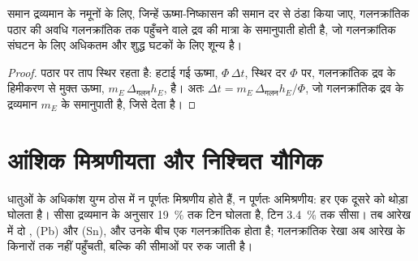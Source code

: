 \begin{proposition}[गलनक्रांतिक पठार की लंबाई]\label{prop:b2:solid-liquid-diagrams:plateau-length}
समान द्रव्यमान के नमूनों के लिए, जिन्हें ऊष्मा-निष्कासन की समान दर से ठंडा किया जाए,
गलनक्रांतिक पठार की अवधि गलनक्रांतिक तक पहुँचने वाले द्रव की मात्रा के
समानुपाती होती है, जो गलनक्रांतिक संघटन के लिए अधिकतम और शुद्ध घटकों के लिए
शून्य है।
\end{proposition}

\begin{proof}
पठार पर ताप स्थिर रहता है: हटाई गई ऊष्मा, $\Phi\,\Delta t$, स्थिर दर $\Phi$ पर,
गलनक्रांतिक द्रव के हिमीकरण से मुक्त ऊष्मा, $m_E\,\Delta_{\text{गलन}}h_E$, है। अतः $\Delta t = m_E\,\Delta_{\text{गलन}}h_E/
\Phi$, जो गलनक्रांतिक द्रव के द्रव्यमान $m_E$ के समानुपाती है, जिसे  देता है।
\end{proof}

\section{आंशिक मिश्रणीयता और निश्चित यौगिक}

धातुओं के अधिकांश युग्म ठोस में न पूर्णतः मिश्रणीय होते हैं, न पूर्णतः अमिश्रणीय:
हर एक दूसरे को थोड़ा घोलता है। सीसा द्रव्यमान के अनुसार 19~\% तक टिन घोलता है,
टिन 3.4~\% तक सीसा। तब आरेख में दो , (Pb) और (Sn), और उनके बीच एक गलनक्रांतिक होता है; गलनक्रांतिक रेखा अब
आरेख के किनारों तक नहीं पहुँचती, बल्कि  की सीमाओं पर
रुक जाती है।

